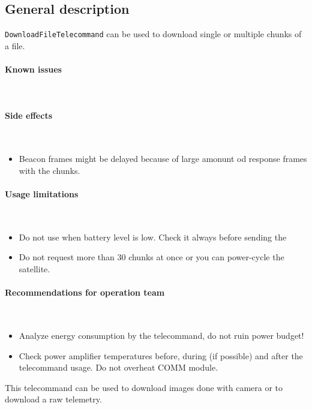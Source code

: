 

\subsection{General description}
\texttt{DownloadFileTelecommand} can be used to download single or multiple chunks of a file.

\paragraph{Known issues} \mbox{} \\
\None

\paragraph{Side effects} \mbox{} \\
\begin{itemize}
    \item Beacon frames might be delayed because of large amonunt od response frames with the chunks. 
\end{itemize}

\paragraph{Usage limitations} \mbox{} \\
\begin{itemize}
    \item Do not use when battery level is low. Check it always before sending the 
    \item Do not request more than 30 chunks at once or you can power-cycle the satellite.
\end{itemize}

\paragraph{Recommendations for operation team} \mbox{} \\
\begin{itemize}
    \item Analyze energy consumption by the telecommand, do not ruin power budget!
    \item Check power amplifier temperatures before, during (if possible) and after the telecommand usage. Do not overheat COMM module.
\end{itemize}
This telecommand can be used to download images done with camera or to download a raw telemetry.

